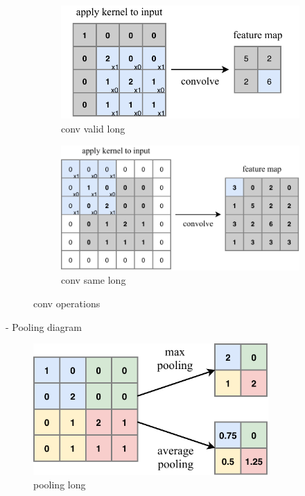 \begin{figure}
    \centering
    \begin{subfigure}[b]{0.65\textwidth}
        \centering
        \includegraphics[width=\textwidth]{diagrams/6-cvn/conv_valid.pdf}
        \caption{conv valid long}
        \label{fig:conv_valid}
    \end{subfigure}
    \hfill
    \begin{subfigure}[b]{0.9\textwidth}
        \centering
        \includegraphics[width=\textwidth]{diagrams/6-cvn/conv_same.pdf}
        \caption{conv same long}
        \label{fig:conv_same}
    \end{subfigure}
    \caption{conv operations}
    \label{fig:conv_operations}
\end{figure}
- Pooling diagram
\begin{figure}
    \includegraphics[width=0.8\textwidth]{diagrams/6-cvn/pooling.pdf}
    \caption[pooling short]{pooling long}
    \label{fig:pooling}
\end{figure}
